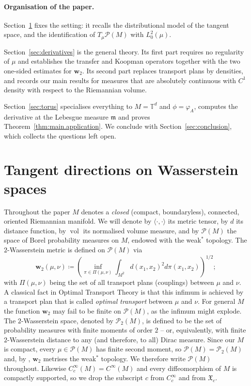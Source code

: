 \documentclass[11pt,reqno]{amsart}
\theoremstyle{plain}
\theoremstyle{definition}
\newcommand{\dw}{\mathbf{w}_2}
\newcommand{\T}{\mathbb{T}}
\newcommand{\Leb}{\mathfrak{m}}
\newcommand{\Prob}{\mathcal{P}}
\DeclareMathOperator{\vol}{vol}
\begin{document}
\paragraph*{\textbf{Organisation of the paper}.}

Section~\ref{sec:setting} fixes the setting: it recalls the distributional model of the tangent space, and the identification of \( T_\mu\Prob(M) \) with \( L^2_0(\mu) \).

Section~\ref{sec:derivatives} is the general theory.
Its first part requires no regularity of \( \mu \) and establishes the transfer and Koopman operators together with the two one-sided estimates for \( \dw \).
Its second part replaces transport plans by densities, and records our main results for measures that are absolutely continuous with \( C^1 \) density with respect to the Riemannian volume.

Section~\ref{sec:torus} specialises everything to \( M=\T^d \) and \( \phi=\varphi_A \), computes the derivative at the Lebesgue measure \( \Leb \) and proves Theorem~\ref{thm:main.application}.
We conclude with Section~\ref{sec:conclusion}, which collects the questions left open.
    
\section{Tangent directions on Wasserstein spaces}
    \label{sec:setting}
Throughout the paper \( M \) denotes a \emph{closed} (compact, boundaryless), connected, oriented Riemannian manifold.
We will denote by \(\langle \cdot, \cdot \rangle\) its metric tensor, by \(d\) its distance function, by \( \vol \) its normalised volume measure, and by \( \Prob(M) \) the space of Borel probability measures on \( M \), endowed with the weak\( ^\ast \) topology.
The \( 2 \)-Wasserstein metric is defined on \( \Prob(M) \) via
\[
    \dw(\mu,\nu) \coloneqq \left(\inf_{\pi\in\Pi(\mu,\nu)}\int_{M^2}d(x_1,x_2)^2 d\pi(x_1,x_2)\right)^{1/2};
\]
with \( \Pi(\mu,\nu) \) being the set of all transport plans (couplings) between \( \mu \) and \( \nu \).
A classical fact in Optimal Transport Theory is that this infimum is achieved by a transport plan that is called \textit{optimal transport} between \( \mu \) and \( \nu \).
For general \( M \) the function \( \dw \) may fail to be finite on \( \Prob(M) \), as the infimum might explode.
The \( 2 \)-Wasserstein space, denoted by \( \Prob_2(M) \), is defined to be the set of probability measures with finite moments of order \( 2 \) -- or, equivalently, with finite \( 2 \)-Wasserstein distance to any (and therefore, to all) Dirac measure.
Since our \( M \) is compact, every \( \mu\in\Prob(M) \) has finite second moment, so \( \Prob(M)=\Prob_2(M) \) and, by \cite[Theorem~6.9]{villani_optimal_2009}, \( \dw \) metrises the weak\( ^\ast \) topology.
We therefore write \( \Prob(M) \) throughout.
Likewise \( C^\infty_c(M)=C^\infty(M) \) and every diffeomorphism of \( M \) is compactly supported, so we drop the subscript \( c \) from \( C^\infty_c \) and from \( \mathfrak X_c \).
\end{document}
